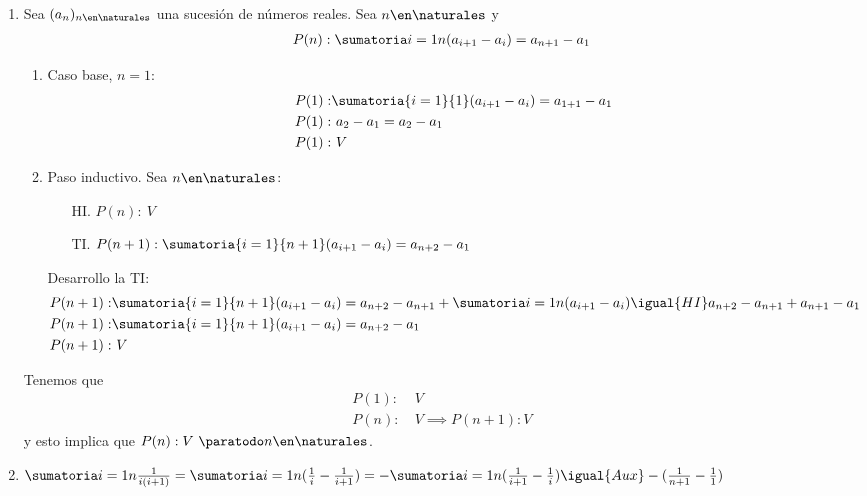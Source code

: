 \begin{enumerate}[label=\roman*)]

	\item Sea $(a_n)_{n \en \naturales }$ una sucesión de números reales. Sea $n \en \naturales $ y
	      \begin{align*}
		      P(n): \suma1n(a_{i+1} - a_i) = a_{n+1} - a_1
	      \end{align*}
	      \begin{enumerate}[label=\arabic*)]

		      \item Caso base, $ n = 1$:
		            \begin{align*}
			            P(1): & \sumatoria{i = 1}{1} (a_{i+1} - a_i) = a_{1+1} - a_1 \\
			            P(1): & \ a_2 - a_1 = a_2 - a_1                              \\
			            P(1): & \ V
		            \end{align*}

		      \item Paso inductivo. Sea $n \en \naturales $:
		            \begin{enumerate}
			            \item[HI.] $P(n): \ V$
			            \item[TI.] $ P(n+1):  \sumatoria{i=1}{n+1} (a_{i+1} - a_i) = a_{n+2} - a_1 $
		            \end{enumerate}
		            Desarrollo la TI:
		            \begin{align*}
			            P(n+1): & \sumatoria{i=1}{n+1} (a_{i+1} - a_i) =
                            a_{n+2} - a_{n+1} + \suma1n(a_{i+1} - a_i) \igual{HI} a_{n+2} - a_{n+1} + a_{n+1} - a_1 \\
			            P(n+1): & \sumatoria{i=1}{n+1}(a_{i+1} - a_i) = a_{n+2} - a_1                                \\
			            P(n+1): & \ V
		            \end{align*}
	      \end{enumerate}

	      Tenemos que
	      \begin{align*}
		      P(1): & \ V                   \\
		      P(n): & \ V \implies P(n+1):V
	      \end{align*}
	      y esto implica que $P(n): V \ \paratodo n \en \naturales $.

	\item $\suma1n \frac{1}{i ( i + 1 )} =
	      \suma1n (\frac{1}{i}- \frac{1}{i+1}) =
	      - \suma1n (\frac{1}{i+1} - \frac{1}{i} ) \igual{Aux}
	      - (\frac{1}{n+1}-\frac{1}{1}) \\$


\end{enumerate}
